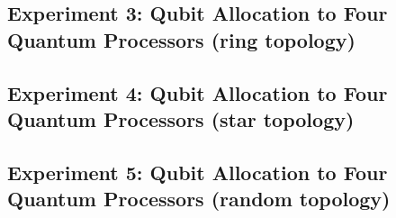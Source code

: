 \subsection{Experiment 3: Qubit Allocation to Four Quantum Processors (ring topology)}
\subsection{Experiment 4: Qubit Allocation to Four Quantum Processors (star topology)}
\subsection{Experiment 5: Qubit Allocation to Four Quantum Processors (random topology)}

